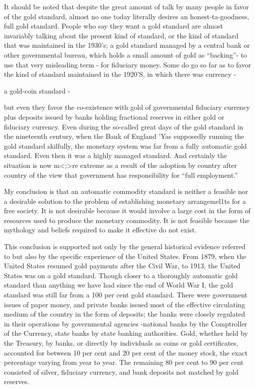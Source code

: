 \documentclass[11pt,openany]{book}
\begin{document}
It should be noted that despite the great amount of talk by many people in favor of the gold standard, almost no one today literally desires an honest-ta-goodness, full gold standard. People who say they want a gold standard are almost invariably talking about the present kind of standard, or the kind of standard that was maintained in the 1930's; a gold standard managed by a central bank or other governmental bureau, which holds a small amount of gold as ``backing''- to use that very misleading term - for fiduciary money. Some do go so far as to favor the kind of standard maintained in the 1920'S, in which there was currency -

a gold-coin standard -

but even they favor the co-existence with gold of governmental fiduciary currency plus deposits issued by banks holding fractional reserves in either gold or fiduciary currency. Even during the so-called great days of the gold standard in the nineteenth century, when the Bank of England 'Yas supposedly running the gold standard skilfully, the monetary system was far from a fully automatic gold standard. Even then it was a highly managed standard. And certainly the situation is now m<;>re extreme as a result of the adoption by country after country of the view that government has responsibility for ``full employment.''

My conclusion is that an automatic commodity standard is neither a feasible nor a desirable solution to the problem of establishing monetary arrangemel1ts for a free society. It is not desirable because it would involve a large cost in the form of resources used to produce the monetary commodity. It is not feasible because the mythology and beliefs required to make it effective do not exist.

This conclusion is supported not only by the general historical evidence referred to but also by the specific experience of the United States. From 1879, when the United States resumed gold payments after the Civil War, to 1913, the United States was on a gold standard. Though closer to a thoroughly automatic gold standard than anything we have had since the end of World War I, the gold standard was still far from a 100 per cent gold standard. There were government issues of paper money, and private banks issued most of the effective circulating medium of the country in the form of deposits; the banks were closely regulated in their operations by governmental agencies -national banks by the Comptroller of the Currency, state banks by state banking authorities. Gold, whether held by the Treasury, by banks, or directly by individuals as coins or gold certificates, accounted for between 10 per cent and 20 per cent of the money stock, the exact percentage varying from year to year. The remaining 80 per cent to 90 per cent consisted of silver, fiduciary currency, and bank deposits not matched by gold reserves.
\end{document}
